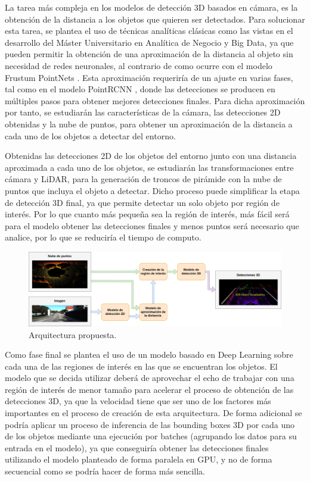 La tarea más compleja en los modelos de detección 3D basados en cámara, es la obtención de la distancia a los objetos que quieren ser detectados. Para solucionar esta tarea, se plantea el uso de técnicas analíticas clásicas como las vistas en el desarrollo del Máster Universitario en Analítica de Negocio y Big Data, ya que pueden permitir la obtención de una aproximación de la distancia al objeto sin necesidad de redes neuronales, al contrario de como ocurre con el modelo Frustum PointNets \cite{Frustum_PointNets}. Esta aproximación requeriría de un ajuste en varias fases, tal como en el modelo PointRCNN \cite{PointRCNN}, donde las detecciones se producen en múltiples pasos para obtener mejores detecciones finales. Para dicha aproximación por tanto, se estudiarán las características de la cámara, las detecciones 2D obtenidas y la nube de puntos, para obtener un aproximación de la distancia a cada uno de los objetos a detectar del entorno.

Obtenidas las detecciones 2D de los objetos del entorno junto con una distancia aproximada a cada uno de los objetos, se estudiarán las transformaciones entre cámara y \ac{LiDAR}, para la generación de troncos de pirámide con la nube de puntos que incluya el objeto a detectar. Dicho proceso puede simplificar la etapa de detección 3D final, ya que permite detectar un solo objeto por región de interés. Por lo que cuanto más pequeña sea la región de interés, más fácil será para el modelo obtener las detecciones finales y menos puntos será necesario que analice, por lo que se reduciría el tiempo de computo.

\begin{figure}[H]
    \centering
    \includegraphics[width=1\textwidth]{Book/figures/3_propuesta/propuesta.drawio.png}
    \caption{Arquitectura propuesta.}
    \label{fig:Arquitectura propuesta.}
\end{figure}

Como fase final se plantea el uso de un modelo basado en Deep Learning sobre cada una de las regiones de interés en las que se encuentran los objetos. El modelo que se decida utilizar deberá de aprovechar el echo de trabajar con una región de interés de menor tamaño para acelerar el proceso de obtención de las detecciones 3D, ya que la velocidad tiene que ser uno de los factores más importantes en el proceso de creación de esta arquitectura. De forma adicional se podría aplicar un proceso de inferencia de las bounding boxes 3D por cada uno de los objetos mediante una ejecución por batches (agrupando los datos para su entrada en el modelo), ya que conseguiría obtener las detecciones finales utilizando el modelo planteado de forma paralela en GPU, y no de forma secuencial como se podría hacer de forma más sencilla.

